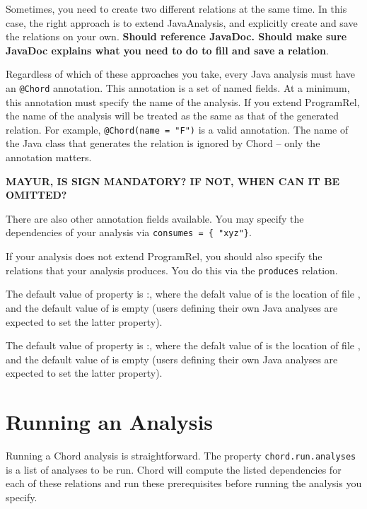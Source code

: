 Sometimes, you need to create two different relations at the same time. In this case, the right approach is to
extend JavaAnalysis, and explicitly create and save the relations on your own.
\textbf{Should reference JavaDoc.  Should make sure JavaDoc explains what you need to do to fill and save a relation}.

Regardless of which of these approaches you take, every Java analysis must have an \texttt{@Chord} annotation.
This annotation is a set of named fields.
At a minimum, this annotation must specify the name of the analysis.
If you extend ProgramRel, the name of the analysis will be treated as the same as that of the generated relation.
For example, \texttt{@Chord(name = "F")} is a valid annotation. 
The name of the Java class that generates the relation is ignored by Chord -- only the annotation matters.

\textbf{MAYUR, IS SIGN MANDATORY?   IF NOT, WHEN CAN IT BE OMITTED?}

There are also other annotation fields available.
You may specify the dependencies of your analysis via \texttt{consumes = \{ "xyz"\}}.

If your analysis does not extend ProgramRel, you should also specify the relations that your 
analysis produces. You do this via the \texttt{produces} relation.

%
%

The default value of property 
is :,
where the defalt value of  is the location of file , and
the default value of  is empty (users defining their own Java analyses are expected to
set the latter property).

The default value of property 
is :,
where the defalt value of  is the location of file , and
the default value of  is empty (users defining their own Java analyses are expected to
set the latter property).

\section{Running an Analysis}
\label{sec:running-analysis}

Running a Chord analysis is straightforward.
The property  \texttt{chord.run.analyses} is a list of analyses to be run. Chord will compute the listed dependencies for each of these relations and run these prerequisites before running the analysis you specify.

